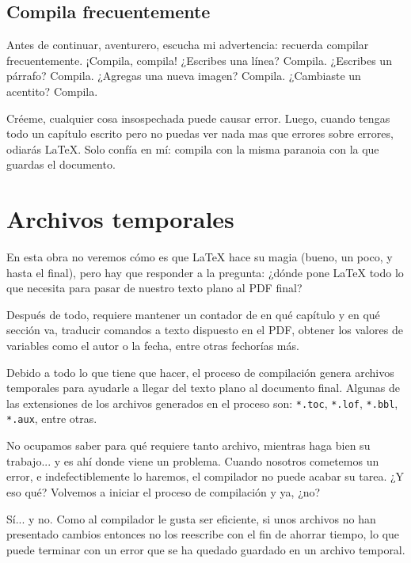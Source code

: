\subsection{Compila frecuentemente}
\label{ssec:compila_frecuentemente}



Antes de continuar, aventurero, escucha mi advertencia: recuerda compilar frecuentemente. ¡Compila, compila! ¿Escribes una línea? Compila. ¿Escribes un párrafo? Compila. ¿Agregas una nueva imagen? Compila. ¿Cambiaste un acentito? Compila.

Créeme, cualquier cosa insospechada puede causar error. Luego, cuando tengas todo un capítulo escrito pero no puedas ver nada mas que errores sobre errores, odiarás \LaTeX{}. Solo confía en mí: compila con la misma paranoia con la que guardas el documento.



\section{Archivos temporales}
\label{sec:archivos_temporales}



En esta obra no veremos cómo es que \LaTeX{} hace su magia (bueno, un poco, y hasta el final), pero hay que responder a la pregunta: ¿dónde pone \LaTeX{} todo lo que necesita para pasar de nuestro texto plano al PDF final?

Después de todo, requiere mantener un contador de en qué capítulo y en qué sección va, traducir comandos a texto dispuesto en el PDF, obtener los valores de variables como el autor o la fecha, entre otras fechorías más.

Debido a todo lo que tiene que hacer, el proceso de compilación genera archivos temporales para ayudarle a llegar del texto plano al documento final. Algunas de las extensiones de los archivos generados en el proceso son: \texttt{*.toc}, \texttt{*.lof}, \texttt{*.bbl}, \texttt{*.aux}, entre otras.

No ocupamos saber para qué requiere tanto archivo, mientras haga bien su trabajo... y es ahí donde viene un problema. Cuando nosotros cometemos un error, e indefectiblemente lo haremos, el compilador no puede acabar su tarea. ¿Y eso qué? Volvemos a iniciar el proceso de compilación y ya, ¿no?

Sí... y no. Como al compilador le gusta ser eficiente, si unos archivos no han presentado cambios entonces no los reescribe con el fin de ahorrar tiempo, lo que puede terminar con un error que se ha quedado guardado en un archivo temporal.

